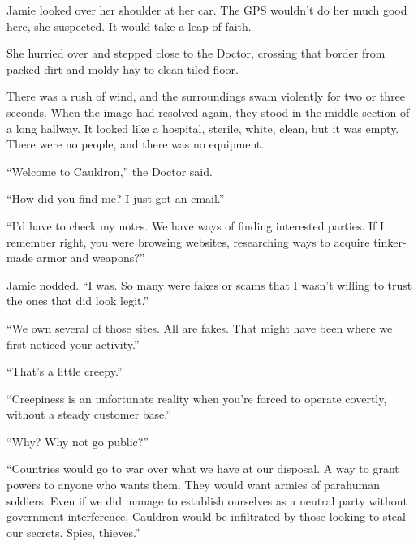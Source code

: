 Jamie looked over her shoulder at her car.  The GPS wouldn't do her much good here, she suspected.  It would take a leap of faith.



She hurried over and stepped close to the Doctor, crossing that border from packed dirt and moldy hay to clean tiled floor.



There was a rush of wind, and the surroundings swam violently for two or three seconds.  When the image had resolved again, they stood in the middle section of a long hallway.  It looked like a hospital, sterile, white, clean, but it was empty.  There were no people, and there was no equipment.



``Welcome to Cauldron,'' the Doctor said.



\sectionbreak



``How did you find me?  I just got an email.''



``I'd have to check my notes.  We have ways of finding interested parties.  If I remember right, you were browsing websites, researching ways to acquire tinker-made armor and weapons?''



Jamie nodded.  ``I was.  So many were fakes or scams that I wasn't willing to trust the ones that did look legit.''



``We own several of those sites.  All are fakes.  That might have been where we first noticed your activity.''



``That's a little creepy.''



``Creepiness is an unfortunate reality when you're forced to operate covertly, without a steady customer base.''



``Why?  Why not go public?''



``Countries would go to war over what we have at our disposal.  A way to grant powers to anyone who wants them.  They would want armies of parahuman soldiers.  Even if we did manage to establish ourselves as a neutral party without government interference, Cauldron would be infiltrated by those looking to steal our secrets.  Spies, thieves.''



